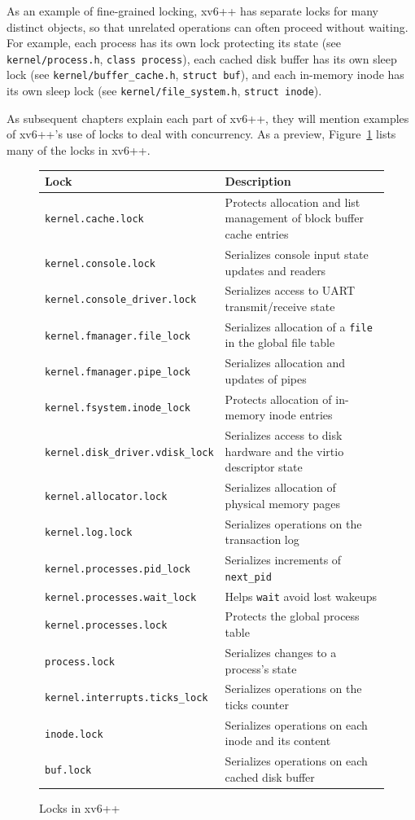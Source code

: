 As an example of fine-grained locking, xv6++ has separate locks for many distinct objects,
so that unrelated operations can often proceed without waiting.
For example, each process has its own lock protecting its state
(see \texttt{kernel/process.h}, \texttt{class process}),
each cached disk buffer has its own sleep lock
(see \texttt{kernel/buffer\_cache.h}, \texttt{struct buf}),
and each in-memory inode has its own sleep lock
(see \texttt{kernel/file\_system.h}, \texttt{struct inode}).

As subsequent chapters explain each part of xv6++, they
will mention examples of xv6++'s use of locks
to deal with concurrency.
As a preview,
Figure~\ref{fig:locktable}
lists many of the locks in xv6++.

\begin{figure}[t]
\center
\begin{tabular}{ll}
{\bf Lock} & {\bf Description} \\
\midrule
\texttt{kernel.cache.lock} & Protects allocation and list management of block buffer cache entries \\
\texttt{kernel.console.lock} & Serializes console input state updates and readers \\
\texttt{kernel.console\_driver.lock} & Serializes access to UART transmit/receive state \\
\texttt{kernel.fmanager.file\_lock} & Serializes allocation of a \texttt{file} in the global file table \\
\texttt{kernel.fmanager.pipe\_lock} & Serializes allocation and updates of pipes \\
\texttt{kernel.fsystem.inode\_lock} & Protects allocation of in-memory inode entries \\
\texttt{kernel.disk\_driver.vdisk\_lock} & Serializes access to disk hardware and the virtio descriptor state \\
\texttt{kernel.allocator.lock} & Serializes allocation of physical memory pages \\
\texttt{kernel.log.lock} & Serializes operations on the transaction log \\
\texttt{kernel.processes.pid\_lock} & Serializes increments of \texttt{next\_pid} \\
\texttt{kernel.processes.wait\_lock} & Helps \texttt{wait} avoid lost wakeups \\
\texttt{kernel.processes.lock} & Protects the global process table \\
\texttt{process.lock} & Serializes changes to a process's state \\
\texttt{kernel.interrupts.ticks\_lock} & Serializes operations on the ticks counter \\
\texttt{inode.lock} & Serializes operations on each inode and its content \\
\texttt{buf.lock} & Serializes operations on each cached disk buffer \\
\end{tabular}
\caption{Locks in xv6++}
\label{fig:locktable}
\end{figure}


